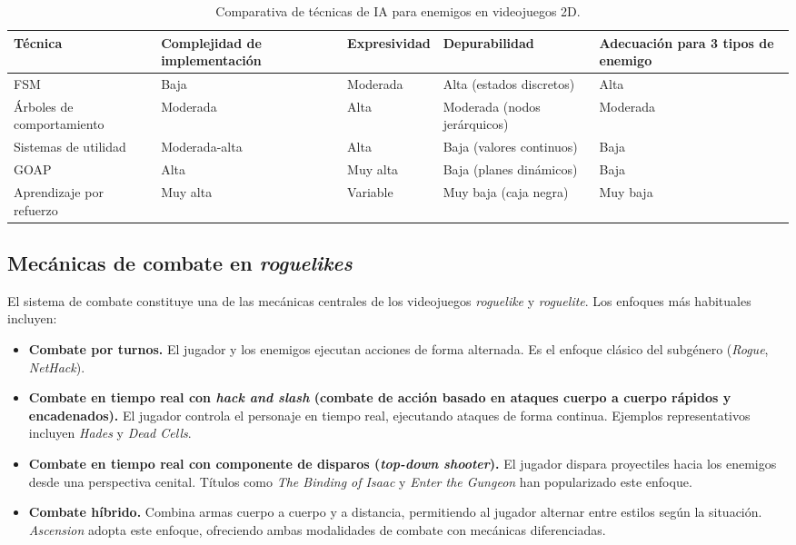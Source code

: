\begin{table}[H]
\centering
{\small
\begin{tabular}{|p{}|p{}|p{}|p{}|p{}|}
\hline
\textbf{Técnica} & \textbf{Complejidad de implementación} & \textbf{Expresividad} & \textbf{Depurabilidad} & \textbf{Adecuación para 3 tipos de enemigo} \\ \hline
FSM & Baja & Moderada & Alta (estados discretos) & Alta \\ \hline
Árboles de comportamiento & Moderada & Alta & Moderada (nodos jerárquicos) & Moderada \\ \hline
Sistemas de utilidad & Moderada-alta & Alta & Baja (valores continuos) & Baja \\ \hline
GOAP & Alta & Muy alta & Baja (planes dinámicos) & Baja \\ \hline
Aprendizaje por refuerzo & Muy alta & Variable & Muy baja (caja negra) & Muy baja \\ \hline
\end{tabular}
}
\caption{Comparativa de técnicas de IA para enemigos en videojuegos 2D.}
\end{table}

\subsection{Mecánicas de combate en \textit{roguelikes}}


El sistema de combate constituye una de las mecánicas centrales de los videojuegos \textit{roguelike} y \textit{roguelite}. Los enfoques más habituales incluyen:

\begin{itemize}
\item \textbf{Combate por turnos.} El jugador y los enemigos ejecutan acciones de forma alternada. Es el enfoque clásico del subgénero (\textit{Rogue}, \textit{NetHack}).
\item \textbf{Combate en tiempo real con \textit{hack and slash} (combate de acción basado en ataques cuerpo a cuerpo rápidos y encadenados).} El jugador controla el personaje en tiempo real, ejecutando ataques de forma continua. Ejemplos representativos incluyen \textit{Hades} y \textit{Dead Cells}.
\item \textbf{Combate en tiempo real con componente de disparos (\textit{top-down shooter}).} El jugador dispara proyectiles hacia los enemigos desde una perspectiva cenital. Títulos como \textit{The Binding of Isaac} y \textit{Enter the Gungeon} han popularizado este enfoque.
\item \textbf{Combate híbrido.} Combina armas cuerpo a cuerpo y a distancia, permitiendo al jugador alternar entre estilos según la situación. \textit{Ascension} adopta este enfoque, ofreciendo ambas modalidades de combate con mecánicas diferenciadas.
\end{itemize}

